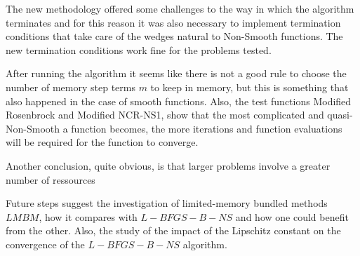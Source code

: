 The new methodology offered some challenges to the way in which the algorithm terminates and for this reason it was also necessary to implement termination conditions that take care of the wedges natural to Non-Smooth functions. The new termination conditions work fine for the problems tested.

After running the algorithm it seems like there is not a good rule to choose the number of memory step terms $m$ to keep in memory, but this is something that also happened in the case of smooth functions. Also, the test functions Modified Rosenbrock and Modified NCR-NS1, show that the most complicated and quasi-Non-Smooth a function becomes, the more iterations and function evaluations will be required for the function to converge.

Another conclusion, quite obvious, is that larger problems involve a greater number of ressources

Future steps suggest the investigation of limited-memory bundled methods $LMBM$, how it compares with $L-BFGS-B-NS$ and how one could benefit from the other. Also, the study of the impact of the Lipschitz constant on the convergence of the $L-BFGS-B-NS$ algorithm\citep{QJ:QJ935}.


